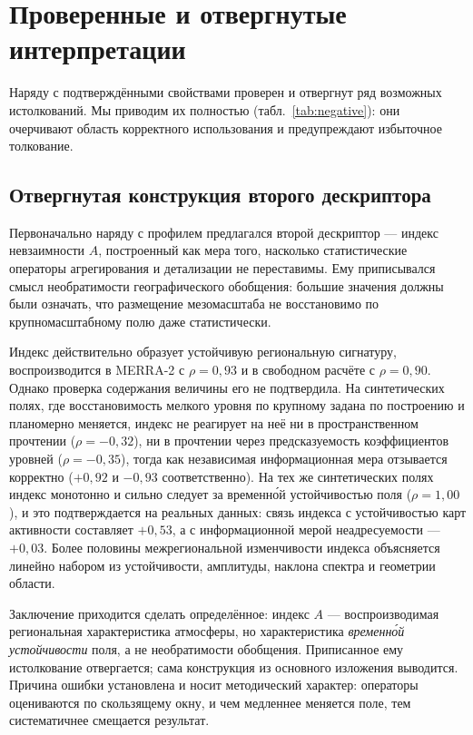\documentclass[11pt,a4paper]{article}
\begin{document}
\section{Проверенные и отвергнутые интерпретации}
\label{sec:limits}

Наряду с подтверждёнными свойствами проверен и отвергнут ряд возможных истолкований. Мы приводим их полностью (табл.~\ref{tab:negative}): они очерчивают область корректного использования и предупреждают избыточное толкование.

\subsection{Отвергнутая конструкция второго дескриптора}

Первоначально наряду с профилем предлагался второй дескриптор --- индекс невзаимности $A$, построенный как мера того, насколько статистические операторы агрегирования и детализации не переставимы. Ему приписывался смысл необратимости географического обобщения: большие значения должны были означать, что размещение мезомасштаба не восстановимо по крупномасштабному полю даже статистически.

Индекс действительно образует устойчивую региональную сигнатуру, воспроизводится в MERRA-2 с $\rho=0{,}93$ и в свободном расчёте с $\rho=0{,}90$. Однако проверка содержания величины его не подтвердила. На синтетических полях, где восстановимость мелкого уровня по крупному задана по построению и планомерно меняется, индекс не реагирует на неё ни в пространственном прочтении ($\rho=-0{,}32$), ни в прочтении через предсказуемость коэффициентов уровней ($\rho=-0{,}35$), тогда как независимая информационная мера отзывается корректно ($+0{,}92$ и $-0{,}93$ соответственно). На тех же синтетических полях индекс монотонно и сильно следует за временн\'{о}й устойчивостью поля ($\rho=1{,}00$), и это подтверждается на реальных данных: связь индекса с устойчивостью карт активности составляет $+0{,}53$, а с информационной мерой неадресуемости --- $+0{,}03$. Более половины межрегиональной изменчивости индекса объясняется линейно набором из устойчивости, амплитуды, наклона спектра и геометрии области.

Заключение приходится сделать определённое: индекс $A$ --- воспроизводимая региональная характеристика атмосферы, но характеристика \emph{временн\'{о}й устойчивости} поля, а не необратимости обобщения. Приписанное ему истолкование отвергается; сама конструкция из основного изложения выводится. Причина ошибки установлена и носит методический характер: операторы оцениваются по скользящему окну, и чем медленнее меняется поле, тем систематичнее смещается результат.
\end{document}
